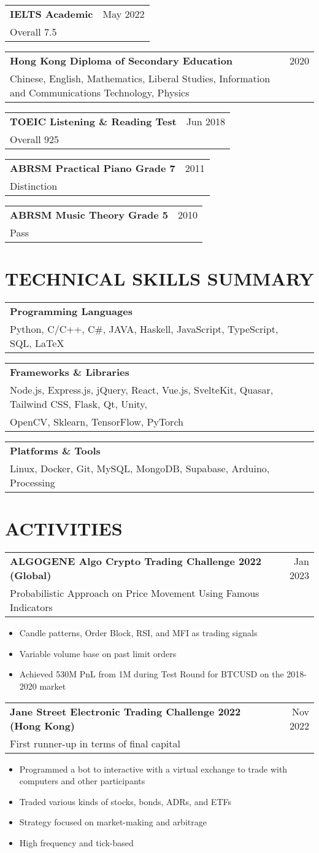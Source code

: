 \documentclass{article}
\makeatletter
\newcommand{\jobTitle}[3]{
    \vspace{0.3cm}
    \begin{tabular*}{1\textwidth}{||l@{\extracolsep{\fill}}r}
        \textbf{#1} & #2\\
        #3 &
    \end{tabular*}
}
\makeatother
\begin{document}
\jobTitle
{IELTS Academic}
{May 2022}
{Overall 7.5}

\jobTitle
{Hong Kong Diploma of Secondary Education}
{2020}
{Chinese, English, Mathematics, Liberal Studies, Information and Communications Technology, Physics}

\jobTitle
{TOEIC Listening \& Reading Test}
{Jun 2018}
{Overall 925}

\jobTitle
{ABRSM Practical Piano Grade 7}
{2011}
{Distinction}

\jobTitle
{ABRSM Music Theory Grade 5}
{2010}
{Pass}

\section{TECHNICAL SKILLS SUMMARY}

\jobTitle
{Programming Languages}
{}
{Python, C/C++, C\#, JAVA, Haskell, JavaScript, TypeScript, SQL, \LaTeX}

\jobTitle
{Frameworks \& Libraries}
{}
{Node.js, Express.js, jQuery, React, Vue.js, SvelteKit, Quasar, Tailwind CSS, Flask, Qt, Unity, \\OpenCV, Sklearn, TensorFlow, PyTorch}

\jobTitle
{Platforms \& Tools}
{}
{Linux, Docker, Git, MySQL, MongoDB, Supabase, Arduino, Processing}

\section{ACTIVITIES}

\jobTitle
{ALGOGENE Algo Crypto Trading Challenge 2022 (Global)}
{Jan 2023}
{Probabilistic Approach on Price Movement Using Famous Indicators}
\begin{itemize}
    \item Candle patterns, Order Block, RSI, and MFI as trading signals
    \item Variable volume base on past limit orders
    \item Achieved 530M PnL from 1M during Test Round for BTCUSD on the 2018-2020 market
\end{itemize}

\jobTitle
{Jane Street Electronic Trading Challenge 2022 (Hong Kong)}
{Nov 2022}
{First runner-up in terms of final capital}
\begin{itemize}
    \item Programmed a bot to interactive with a virtual exchange to trade with computers and other participants
    \item Traded various kinds of stocks, bonds, ADRs, and ETFs
    \item Strategy focused on market-making and arbitrage
    \item High frequency and tick-based
\end{itemize}
\end{document}
